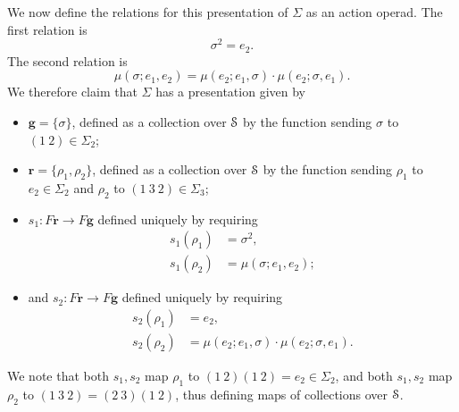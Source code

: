\begin{example}
We now define the relations for this presentation of $\Sigma$ as an action operad.
The first relation is 
\begin{equation}\label{eq:rel1}
\sigma^2 = e_2.
\end{equation}
The second relation is
\begin{equation}\label{eq:rel2}
\mu(\sigma; e_1, e_2) = \mu(e_2; e_1, \sigma) \cdot \mu(e_2; \sigma, e_1).
\end{equation}
We therefore claim that $\Sigma$ has a presentation given by
\begin{itemize}
\item $\mathbf{g} = \{ \sigma \}$, defined as a collection over $\mathcal{S}$ by the function sending $\sigma$ to $(1 \ 2) \in \Sigma_2$;
\item $\mathbf{r} = \{ \rho_1, \rho_2 \}$, defined as a collection over $\mathcal{S}$ by the function sending $\rho_1$ to $e_2 \in \Sigma_2$ and $\rho_2$ to $(1 \ 3 \ 2) \in \Sigma_3$;
\item $s_1 \colon F\mathbf{r} \to F\mathbf{g}$ defined uniquely by requiring
\begin{align*}
s_1(\rho_1) & = \sigma^2,\\
s_1(\rho_2) & = \mu(\sigma; e_1, e_2);
\end{align*}
\item and $s_2 \colon F\mathbf{r} \to F\mathbf{g}$ defined uniquely by requiring
\begin{align*}
s_2(\rho_1) & = e_2,\\
s_2(\rho_2) & = \mu(e_2; e_1, \sigma) \cdot \mu(e_2; \sigma, e_1).
\end{align*}
\end{itemize}
We note that both $s_1, s_2$ map $\rho_1$ to $(1 \ 2)(1 \ 2) = e_2 \in \Sigma_2$, and both $s_1, s_2$ map $\rho_2$ to $(1 \ 3 \ 2) = (2 \ 3)(1 \ 2)$, thus defining maps of collections over $\mathcal{S}$.


\end{example}
